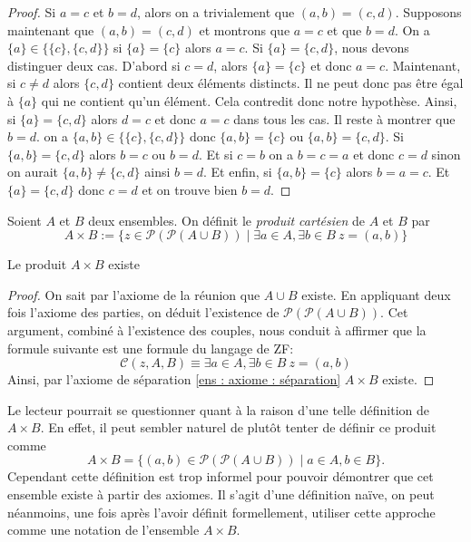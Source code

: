 \begin{proof}
    Si $a=c$ et $b=d$, alors on a trivialement que $(a,b)=(c,d)$. Supposons maintenant que $(a,b)=(c,d)$ et montrons que $a=c$ et que $b=d$. On a $\{a\}\in \{\{c\},\{c,d\}\}$ si $\{a\}=\{c\}$ alors $a=c$. Si $\{a\}=\{c,d\}$, nous devons distinguer deux cas. D'abord si $c=d$, alors $\{a\}=\{c\}$ et donc $a=c$. Maintenant, si $c\neq d$ alors $\{c,d\}$ contient deux éléments distincts. Il ne peut donc pas être égal à $\{a\}$ qui ne contient qu'un élément. Cela contredit donc notre hypothèse. Ainsi, si $\{a\}=\{c,d\}$ alors $d=c$ et donc $a=c$ dans tous les cas. Il reste à montrer que $b=d$. on a $\{a,b\}\in \{\{c\},\{c,d\}\}$ donc $\{a,b\}=\{c\}$ ou $\{a,b\}=\{c,d\}$. Si $\{a,b\}=\{c,d\}$ alors $b=c$ ou $b=d$. Et si $c=b$ on a $b=c=a$ et donc $c=d$ sinon on aurait $\{a,b\} \neq \{c,d\}$ ainsi $b=d$. Et enfin, si $\{a,b\}=\{c\}$ alors $b=a=c$. Et $\{a\}=\{c,d\}$ donc $c=d$ et on trouve bien $b=d$.
\end{proof}

\begin{definition}
Soient $A$ et $B$ deux ensembles. On définit le \emph{produit cartésien} de $A$ et $B$ par
\[
A\times B := \{z\in \mathscr P( \mathscr P(A\cup B)) \mid \exists a\in A, \exists b\in B \: z=(a,b)\}
\]
\end{definition}
\begin{proposition}
    Le produit $A\times B$ existe 
\end{proposition}
\begin{proof}
    On sait par l'axiome de la réunion que $A\cup B$ existe. En appliquant deux fois l’axiome des parties, on déduit l'existence de $\mathscr P( \mathscr P(A\cup B))$. Cet argument, combiné à l'existence des couples, nous conduit à affirmer que la formule suivante est une formule du langage de ZF:
    \[
    \mathscr C(z,A,B)\equiv  \exists a\in A, \exists b\in B \: z=(a,b)
    \]
    Ainsi, par l'axiome de séparation \ref{ens : axiome : séparation} $A\times B$ existe.
\end{proof}

\begin{remarque}
    Le lecteur pourrait se questionner quant à la raison d'une telle définition de $A\times B$. En effet, il peut sembler naturel de plutôt tenter de définir ce produit comme
    \[
    A\times B =\{(a,b)\in \mathscr P( \mathscr P(A\cup B)) \mid a\in A, b\in B \}.
    \]
    Cependant cette définition est trop informel pour pouvoir démontrer que cet ensemble existe à partir des axiomes. Il s'agit d'une définition naïve, on peut néanmoins, une fois après l'avoir définit formellement, utiliser cette approche comme une notation de l'ensemble $A\times B$. 
\end{remarque}


